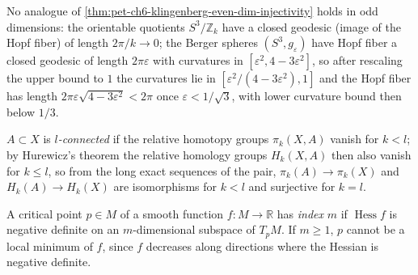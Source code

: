 \begin{remark}
  \label{rem:pet-ch6-klingenberg-odd-dim-counterexample}
  No analogue of \cref{thm:pet-ch6-klingenberg-even-dim-injectivity} holds in
  odd dimensions: the orientable quotients $S^3/\mathbb{Z}_k$ have a closed
  geodesic (image of the Hopf fiber) of length $2\pi/k\to0$; the Berger
  spheres $(S^3,g_\varepsilon)$ have Hopf fiber a closed geodesic of length
  $2\pi\varepsilon$ with curvatures in $[\varepsilon^2,4-3\varepsilon^2]$, so
  after rescaling the upper bound to $1$ the curvatures lie in
  $[\varepsilon^2/(4-3\varepsilon^2),1]$ and the Hopf fiber has length
  $2\pi\varepsilon\sqrt{4-3\varepsilon^2}<2\pi$ once $\varepsilon<1/\sqrt3$,
  with lower curvature bound then below $1/3$.
\end{remark}

\begin{definition}
  \label{def:pet-ch6-l-connected}
  $A\subset X$ is \emph{$l$-connected} if the relative homotopy groups
  $\pi_k(X,A)$ vanish for $k<l$; by Hurewicz's theorem the relative homology
  groups $H_k(X,A)$ then also vanish for $k\le l$, so from the long exact
  sequences of the pair, $\pi_k(A)\to\pi_k(X)$ and $H_k(A)\to H_k(X)$ are
  isomorphisms for $k<l$ and surjective for $k=l$.
\end{definition}

\begin{definition}
  \label{def:pet-ch6-critical-point-index}
  A critical point $p\in M$ of a smooth function $f:M\to\mathbb{R}$ has \emph{index}
  $m$ if $\operatorname{Hess}f$ is negative definite on an $m$-dimensional subspace of
  $T_pM$. If $m\ge1$, $p$ cannot be a local minimum of $f$, since $f$
  decreases along directions where the Hessian is negative definite.
\end{definition}


